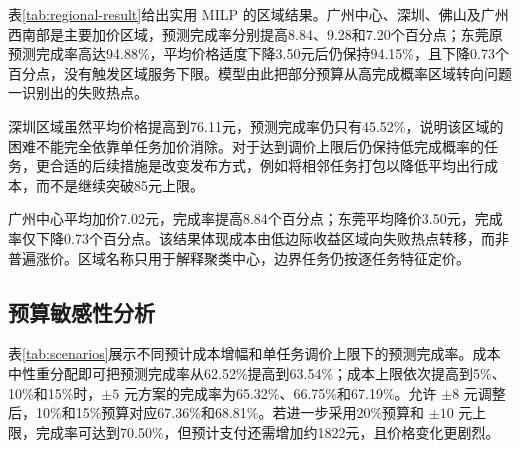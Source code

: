 ﻿\documentclass[UTF8,zihao=-4,a4paper,fontset=fandol]{ctexart}
\begin{document}
表\ref{tab:regional-result}给出实用 MILP 的区域结果。广州中心、深圳、佛山及广州西南部是主要加价区域，预测完成率分别提高8.84、9.28和7.20个百分点；东莞原预测完成率高达94.88\%，平均价格适度下降3.50元后仍保持94.15\%，且下降0.73个百分点，没有触发区域服务下限。模型由此把部分预算从高完成概率区域转向问题一识别出的失败热点。

\begin{table}[H]
  \centering
  \caption{实用MILP方案的区域价格与预测完成率变化}
  \label{tab:regional-result}
\end{table}

深圳区域虽然平均价格提高到76.11元，预测完成率仍只有45.52\%，说明该区域的困难不能完全依靠单任务加价消除。对于达到调价上限后仍保持低完成概率的任务，更合适的后续措施是改变发布方式，例如将相邻任务打包以降低平均出行成本，而不是继续突破85元上限。

广州中心平均加价7.02元，完成率提高8.84个百分点；东莞平均降价3.50元，完成率仅下降0.73个百分点。该结果体现成本由低边际收益区域向失败热点转移，而非普遍涨价。区域名称只用于解释聚类中心，边界任务仍按逐任务特征定价。

\subsection{预算敏感性分析}

表\ref{tab:scenarios}展示不同预计成本增幅和单任务调价上限下的预测完成率。成本中性重分配即可把预测完成率从62.52\%提高到63.54\%；成本上限依次提高到5\%、10\%和15\%时，$\pm5$ 元方案的完成率为65.32\%、66.75\%和67.19\%。允许 $\pm8$ 元调整后，10\%和15\%预算对应67.36\%和68.81\%。若进一步采用20\%预算和 $\pm10$ 元上限，完成率可达到70.50\%，但预计支付还需增加约1822元，且价格变化更剧烈。
\end{document}
